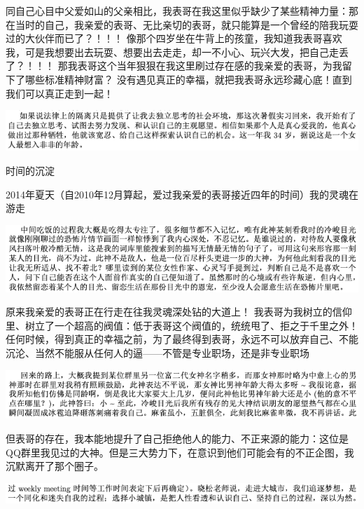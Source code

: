 \documentclass[9pt, b5paper]{article}
\begin{document}
同自己心目中父爱如山的父亲相比，我表哥在我这里似乎缺少了某些精神力量：那在当时的自己，我亲爱的表哥、无比亲切的表哥，就只能算是一个曾经的陪我玩耍过的大伙伴而已了？！！！
像那个四岁坐在牛背上的孩童，我知道我表哥喜欢我，可是我想要出去玩耍、想要出去走走，却一不小心、玩兴大发，把自己走丢了？！！！
那我表哥这个当年狠狠在我这里刷过存在感的我亲爱的表哥，为我留下了哪些标准精神财富？
没有遇见真正的幸福，就把我表哥永远珍藏心底！直到我们可以真正走到一起！

\begin{center}
\includegraphics[width=.9\linewidth]{./pic/backups_plans_20210422_075830.png}
\end{center}

时间的沉淀

2014年夏天（自2010年12月算起，爱过我亲爱的表哥接近四年的时间）我的灵魂在游走

\begin{center}
\includegraphics[width=.9\linewidth]{./pic/backups_plans_20210422_090949.png}
\end{center}

原来我亲爱的表哥正在行走在往我灵魂深处钻的大道上！
我表哥为我树立的信仰里、树立了一个超高的阀值：低于表哥这个阀值的，统统甩了、拒之于千里之外！
任何时候，得到真正的幸福之前，为了最终得到表哥，永远不可以放弃自己、不能沉沦、当然不能服从任何人的逼——不管是专业职场，还是非专业职场

\begin{center}
\includegraphics[width=.9\linewidth]{./pic/backups_plans_20210422_091109.png}
\end{center}

但表哥的存在，我本能地提升了自己拒绝他人的能力、不正来源的能力：这位是QQ群里我见过的大神。但是三大势力下，在意识到他们可能会有的不正企图，我沉默离开了那个圈子。 

\begin{center}
\includegraphics[width=.9\linewidth]{./pic/backups_plans_20210422_091518.png}
\end{center}
\end{document}
